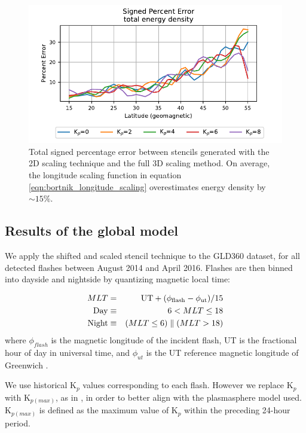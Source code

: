 \begin{figure}[h!]
\begin{center}
\includegraphics{figures/longitude_scaling_total_error.pdf}
\caption[Total percent error in 2D scaling]{Total signed percentage error between stencils generated with the 2D scaling technique and the full 3D scaling method. On average, the longitude scaling function in equation \eqref{eqn:bortnik_longitude_scaling} overestimates energy density by $\sim 15\%$.}
\label{fig:longitude_scaling_total}
\end{center}
\end{figure}

\subsection{Results of the global model}
We apply the shifted and scaled stencil technique to the GLD360 dataset, for all detected flashes between August 2014 and April 2016. Flashes are then binned into dayside and nightside by quantizing magnetic local time:

\begin{eqnarray}
\label{eqn:MLT}
MLT & = & \mathrm{UT} + (\phi_{\rm{flash}} - \phi_{\rm{ut}})/15 \\
\mathrm{Day} & \equiv & 6 < MLT \leq 18 \\
\mathrm{Night} & \equiv & (MLT \leq 6) \parallel (MLT > 18)
\end{eqnarray}
\noindent where $\phi_{flash}$ is the magnetic longitude of the incident flash, UT is the fractional hour of day in universal time, and $\phi_{ut}$ is the UT reference magnetic longitude of Greenwich \citep{Laundal2016}.

We use historical K$_p$ values corresponding to each flash. However we replace K$_p$ with K$_{p(max)}$, as in \cite{Carpenter1992}, in order to better align with the plasmasphere model used. K$_{p(max)}$ is defined as the maximum value of K$_p$ within the preceding 24-hour period.

